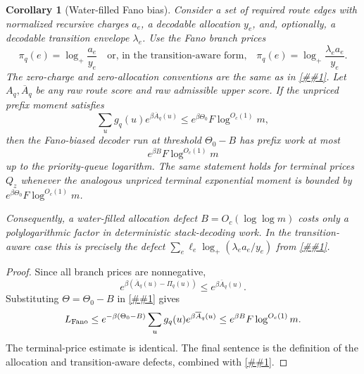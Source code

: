 \documentclass[10pt]{article}
\newcommand{\cref}[1]{\ref{##1}}
\newtheorem{corollary}[theorem]{Corollary}
\theoremstyle{definition}
\begin{document}
\begin{corollary}[Water-filled Fano bias]
   \label{cor:waterfilled-fano-bias}
   Consider a set of required route edges with normalized recursive charges
   \(a_e\), a decodable allocation \(y_e\), and, optionally, a decodable
   transition envelope \(\lambda_e\).  Use the Fano branch prices
   \[
      \pi_q(e)=\log_+\frac{a_e}{y_e}
      \quad\text{or, in the transition-aware form,}\quad
      \pi_q(e)=\log_+\frac{\lambda_ea_e}{y_e}.
   \]
   The zero-charge and zero-allocation conventions are the same as in
   \cref{lem:waterfilled-allocation}.
   Let \(A_q,\overline A_q\) be any raw route score and raw admissible upper
   score.  If the unpriced prefix moment satisfies
   \[
      \sum_u g_q(u)e^{\beta\overline A_q(u)}
      \le e^{\beta\Theta_0}F\log^{O_c(1)}m,
   \]
   then the Fano-biased decoder run at threshold \(\Theta_0-B\) has prefix work
   at most
   \[
      e^{\beta B}F\log^{O_c(1)}m
   \]
   up to the priority-queue logarithm.  The same statement holds for terminal
   prices \(Q_z\) whenever the analogous unpriced terminal exponential moment is
   bounded by \(e^{\beta\Theta_0}F\log^{O_c(1)}m\).

   Consequently, a water-filled allocation defect \(B=O_c(\log\log m)\) costs
   only a polylogarithmic factor in deterministic stack-decoding work.  In the
   transition-aware case this is precisely the defect
   \(\sum_e\ell_e\log_+(\lambda_ea_e/y_e)\) from
   \cref{cor:transition-waterfilled-allocation}.
\end{corollary}

\begin{proof}
   Since all branch prices are nonnegative,
   \[
      e^{\beta(\overline A_q(u)-\Pi_q(u))}
      \le e^{\beta\overline A_q(u)}.
   \]
   Substituting \(\Theta=\Theta_0-B\) in
   \cref{lem:fano-biased-prefix-list} gives
   \[
      L_{\rm Fano}
      \le
      e^{-\beta(\Theta_0-B)}
      \sum_u g_q(u)e^{\beta\overline A_q(u)}
      \le
      e^{\beta B}F\log^{O_c(1)}m.
   \]
   The terminal-price estimate is identical.  The final sentence is the
   definition of the allocation and transition-aware defects, combined with
   \cref{lem:fano-biased-prefix-list}.
\end{proof}
\end{document}
